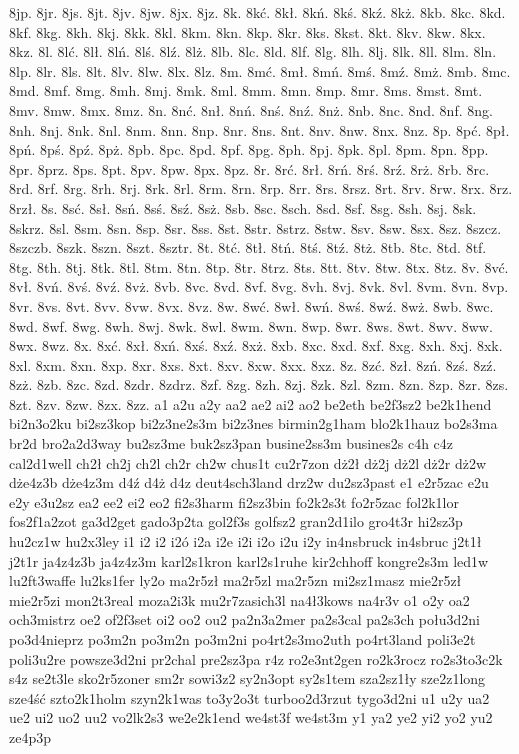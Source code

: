 {8jp.
8jr.
8js.
8jt.
8jv.
8jw.
8jx.
8jz.
8k.
8k\'c.
8k\l .
8k\'n.
8k\'s.
8k\'z.
8k\.z.
8kb.
8kc.
8kd.
8kf.
8kg.
8kh.
8kj.
8kk.
8kl.
8km.
8kn.
8kp.
8kr.
8ks.
8kst.
8kt.
8kv.
8kw.
8kx.
8kz.
8l.
8l\'c.
8l\l .
8l\'n.
8l\'s.
8l\'z.
8l\.z.
8lb.
8lc.
8ld.
8lf.
8lg.
8lh.
8lj.
8lk.
8ll.
8lm.
8ln.
8lp.
8lr.
8ls.
8lt.
8lv.
8lw.
8lx.
8lz.
8m.
8m\'c.
8m\l .
8m\'n.
8m\'s.
8m\'z.
8m\.z.
8mb.
8mc.
8md.
8mf.
8mg.
8mh.
8mj.
8mk.
8ml.
8mm.
8mn.
8mp.
8mr.
8ms.
8mst.
8mt.
8mv.
8mw.
8mx.
8mz.
8n.
8n\'c.
8n\l .
8n\'n.
8n\'s.
8n\'z.
8n\.z.
8nb.
8nc.
8nd.
8nf.
8ng.
8nh.
8nj.
8nk.
8nl.
8nm.
8nn.
8np.
8nr.
8ns.
8nt.
8nv.
8nw.
8nx.
8nz.
8p.
8p\'c.
8p\l .
8p\'n.
8p\'s.
8p\'z.
8p\.z.
8pb.
8pc.
8pd.
8pf.
8pg.
8ph.
8pj.
8pk.
8pl.
8pm.
8pn.
8pp.
8pr.
8prz.
8ps.
8pt.
8pv.
8pw.
8px.
8pz.
8r.
8r\'c.
8r\l .
8r\'n.
8r\'s.
8r\'z.
8r\.z.
8rb.
8rc.
8rd.
8rf.
8rg.
8rh.
8rj.
8rk.
8rl.
8rm.
8rn.
8rp.
8rr.
8rs.
8rsz.
8rt.
8rv.
8rw.
8rx.
8rz.
8rz\l .
8s.
8s\'c.
8s\l .
8s\'n.
8s\'s.
8s\'z.
8s\.z.
8sb.
8sc.
8sch.
8sd.
8sf.
8sg.
8sh.
8sj.
8sk.
8skrz.
8sl.
8sm.
8sn.
8sp.
8sr.
8ss.
8st.
8str.
8strz.
8stw.
8sv.
8sw.
8sx.
8sz.
8szcz.
8szczb.
8szk.
8szn.
8szt.
8sztr.
8t.
8t\'c.
8t\l .
8t\'n.
8t\'s.
8t\'z.
8t\.z.
8tb.
8tc.
8td.
8tf.
8tg.
8th.
8tj.
8tk.
8tl.
8tm.
8tn.
8tp.
8tr.
8trz.
8ts.
8tt.
8tv.
8tw.
8tx.
8tz.
8v.
8v\'c.
8v\l .
8v\'n.
8v\'s.
8v\'z.
8v\.z.
8vb.
8vc.
8vd.
8vf.
8vg.
8vh.
8vj.
8vk.
8vl.
8vm.
8vn.
8vp.
8vr.
8vs.
8vt.
8vv.
8vw.
8vx.
8vz.
8w.
8w\'c.
8w\l .
8w\'n.
8w\'s.
8w\'z.
8w\.z.
8wb.
8wc.
8wd.
8wf.
8wg.
8wh.
8wj.
8wk.
8wl.
8wm.
8wn.
8wp.
8wr.
8ws.
8wt.
8wv.
8ww.
8wx.
8wz.
8x.
8x\'c.
8x\l .
8x\'n.
8x\'s.
8x\'z.
8x\.z.
8xb.
8xc.
8xd.
8xf.
8xg.
8xh.
8xj.
8xk.
8xl.
8xm.
8xn.
8xp.
8xr.
8xs.
8xt.
8xv.
8xw.
8xx.
8xz.
8z.
8z\'c.
8z\l .
8z\'n.
8z\'s.
8z\'z.
8z\.z.
8zb.
8zc.
8zd.
8zdr.
8zdrz.
8zf.
8zg.
8zh.
8zj.
8zk.
8zl.
8zm.
8zn.
8zp.
8zr.
8zs.
8zt.
8zv.
8zw.
8zx.
8zz.
a1
a2u
a2y
aa2
ae2
ai2
ao2
be2eth
be2f3sz2
be2k1hend
bi2n3o2ku
bi2sz3kop
bi2z3ne2s3m
bi2z3nes
birmin2g1ham
blo2k1hauz
bo2s3ma
br2d
bro2a2d3way
bu2sz3me
buk2sz3pan
busine2ss3m
busines2s
c4h
c4z
cal2d1well
ch2\l 
ch2j
ch2l
ch2r
ch2w
chus1t
cu2r7zon
d\.z2\l 
d\.z2j
d\.z2l
d\.z2r
d\.z2w
d\.ze4z3b
d\.ze4z3m
d4\'z
d4\.z
d4z
deut4sch3land
drz2w
du2sz3past
e1
e2r5zac
e2u
e2y
e3u2sz
ea2
ee2
ei2
eo2
fi2s3harm
fi2sz3bin
fo2k2s3t
fo2r5zac
fol2k1lor
fos2f1a2zot
ga3d2get
gado3p2ta
gol2f3s
golfsz2
gran2d1ilo
gro4t3r
hi2sz3p
hu2cz1w
hu2x3ley
i1
i2\ka
i2\ke
i2\'o
i2a
i2e
i2i
i2o
i2u
i2y
in4nsbruck
in4sbruc
j2t1\l 
j2t1r
ja4z4z3b
ja4z4z3m
karl2s1kron
karl2s1ruhe
kir2chhoff
kongre2s3m
led1w
lu2ft3waffe
lu2ks1fer
ly2o
ma2r5z\l 
ma2r5zl
ma2r5zn
mi2sz1masz
mie2r5z\l 
mie2r5zi
mon2t3real
moza2i3k
mu2r7zasich3l
na4\l 3kows
na4r3v
o1
o2y
oa2
och3mistrz
oe2
of2f3set
oi2
oo2
ou2
pa2n3a2mer
pa2s3cal
pa2s3ch
po\l u3d2ni
po3d4nieprz
po3m2n\ka
po3m2n\ke
po3m2ni
po4rt2s3mo2uth
po4rt3land
poli3e2t
poli3u2re
powsze3d2ni
pr2chal
pre2sz3pa
r4z
ro2e3nt2gen
ro2k3rocz
ro2s3to3c2k
s4z
se2t3le
sko2r5zoner
sm2r
sowi3z2
sy2n3opt
sy2s1tem
sza2sz1\l y
sze2z1long
sze4\'s\'c
szto2k1holm
szyn2k1was
to3y2o3t
turboo2d3rzut
tygo3d2ni
u1
u2y
ua2
ue2
ui2
uo2
uu2
vo2lk2s3
we2e2k1end
we4st3f
we4st3m
y1
ya2
ye2
yi2
yo2
yu2
ze4p3p
}

